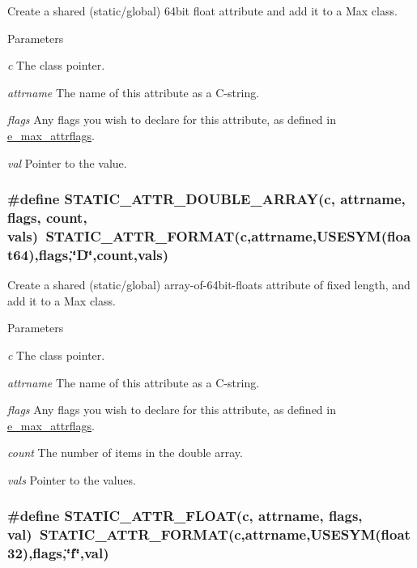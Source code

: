 Create a shared (static/global) 64bit float attribute and add it to a Max class. 
\begin{DoxyParams}{Parameters}
\item[{\em c}]The class pointer. \item[{\em attrname}]The name of this attribute as a C-\/string. \item[{\em flags}]Any flags you wish to declare for this attribute, as defined in \hyperlink{group__attr_gaf296cfc6741bb19207f6ed8062809115}{e\_\-max\_\-attrflags}. \item[{\em val}]Pointer to the value. \end{DoxyParams}
\hypertarget{group__attr_ga7b71a8972ec7cfd9129f5093660e2d06}{
\subsubsection[{STATIC\_\-ATTR\_\-DOUBLE\_\-ARRAY}]{\setlength{\rightskip}{0pt plus 5cm}\#define STATIC\_\-ATTR\_\-DOUBLE\_\-ARRAY(c, \/  attrname, \/  flags, \/  count, \/  vals)~STATIC\_\-ATTR\_\-FORMAT(c,attrname,USESYM(float64),flags,\char`\"{}D\char`\"{},count,vals)}}
\label{group__attr_ga7b71a8972ec7cfd9129f5093660e2d06}


Create a shared (static/global) array-\/of-\/64bit-\/floats attribute of fixed length, and add it to a Max class. 
\begin{DoxyParams}{Parameters}
\item[{\em c}]The class pointer. \item[{\em attrname}]The name of this attribute as a C-\/string. \item[{\em flags}]Any flags you wish to declare for this attribute, as defined in \hyperlink{group__attr_gaf296cfc6741bb19207f6ed8062809115}{e\_\-max\_\-attrflags}. \item[{\em count}]The number of items in the double array. \item[{\em vals}]Pointer to the values. \end{DoxyParams}
\hypertarget{group__attr_ga166e7a3a2d7b3f0932c2dd9063673fc6}{
\subsubsection[{STATIC\_\-ATTR\_\-FLOAT}]{\setlength{\rightskip}{0pt plus 5cm}\#define STATIC\_\-ATTR\_\-FLOAT(c, \/  attrname, \/  flags, \/  val)~STATIC\_\-ATTR\_\-FORMAT(c,attrname,USESYM(float32),flags,\char`\"{}f\char`\"{},val)}}
\label{group__attr_ga166e7a3a2d7b3f0932c2dd9063673fc6}


